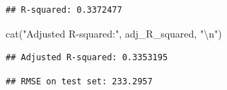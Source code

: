 \documentclass[
]{article}
\newenvironment{Shaded}{\begin{snugshade}}{\end{snugshade}}
\newcommand{\CommentTok}[1]{\textcolor[rgb]{0.56,0.35,0.01}{\textit{#1}}}
\newcommand{\DecValTok}[1]{\textcolor[rgb]{0.00,0.00,0.81}{#1}}
\newcommand{\FunctionTok}[1]{\textcolor[rgb]{0.00,0.00,0.00}{#1}}
\newcommand{\NormalTok}[1]{#1}
\newcommand{\OtherTok}[1]{\textcolor[rgb]{0.56,0.35,0.01}{#1}}
\newcommand{\SpecialCharTok}[1]{\textcolor[rgb]{0.00,0.00,0.00}{#1}}
\newcommand{\StringTok}[1]{\textcolor[rgb]{0.31,0.60,0.02}{#1}}
\begin{document}
\begin{verbatim}
## R-squared: 0.3372477
\end{verbatim}

\begin{Shaded}
\begin{Highlighting}[]
\FunctionTok{cat}\NormalTok{(}\StringTok{"Adjusted R{-}squared:"}\NormalTok{, adj\_R\_squared, }\StringTok{"}\SpecialCharTok{\textbackslash{}n}\StringTok{"}\NormalTok{)}
\end{Highlighting}
\end{Shaded}

\begin{verbatim}
## Adjusted R-squared: 0.3353195
\end{verbatim}

\begin{Shaded}
\end{Shaded}

\begin{verbatim}
## RMSE on test set: 233.2957
\end{verbatim}
\end{document}
